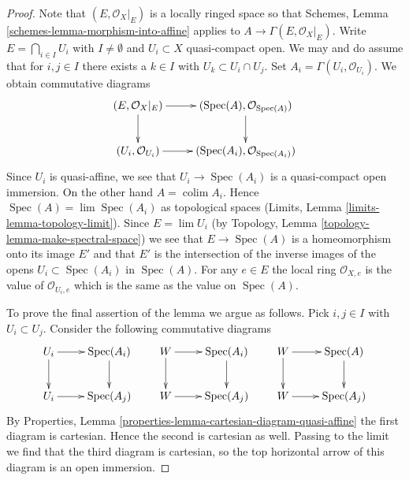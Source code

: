 \documentclass{stacks-project}
\theoremstyle{plain}
\theoremstyle{definition}
\theoremstyle{remark}
\numberwithin{equation}{subsection}
\def\lim{\mathop{\mathrm{lim}}\nolimits}
\def\colim{\mathop{\mathrm{colim}}\nolimits}
\def\Spec{\mathop{\mathrm{Spec}}}
\begin{document}
\begin{proof}
Note that $(E, \mathcal{O}_X|_E)$ is a locally ringed space so that
Schemes, Lemma \ref{schemes-lemma-morphism-into-affine} applies
to $A \to \Gamma(E, \mathcal{O}_X|_E)$. Write $E = \bigcap_{i \in I} U_i$
with $I \not = \emptyset$ and $U_i \subset X$ quasi-compact open.
We may and do assume that for $i, j \in I$ there exists a $k \in I$ with
$U_k \subset U_i \cap U_j$. Set $A_i = \Gamma(U_i, \mathcal{O}_{U_i})$.
We obtain commutative diagrams
$$
\xymatrix{
(E, \mathcal{O}_X|_E) \ar[r] \ar[d] &
(\Spec(A), \mathcal{O}_{\Spec(A)}) \ar[d] \\
(U_i, \mathcal{O}_{U_i}) \ar[r] &
(\Spec(A_i), \mathcal{O}_{\Spec(A_i)})
}
$$
Since $U_i$ is quasi-affine, we see that $U_i \to \Spec(A_i)$
is a quasi-compact open immersion. On the other hand
$A = \colim A_i$. Hence $\Spec(A) = \lim \Spec(A_i)$ as topological
spaces (Limits, Lemma \ref{limits-lemma-topology-limit}). Since
$E = \lim U_i$ (by Topology, Lemma \ref{topology-lemma-make-spectral-space})
we see that $E \to \Spec(A)$ is a homeomorphism onto its
image $E'$ and that $E'$ is the intersection of the inverse images
of the opens $U_i \subset \Spec(A_i)$ in $\Spec(A)$. For any
$e \in E$ the local ring $\mathcal{O}_{X, e}$ is the value
of $\mathcal{O}_{U_i, e}$ which is the same as the value on $\Spec(A)$.

\medskip\noindent
To prove the final assertion of the lemma we argue as follows.
Pick $i, j \in I$ with $U_i \subset U_j$.
Consider the following commutative diagrams
$$
\xymatrix{
U_i \ar[r] \ar[d] & \Spec(A_i) \ar[d] \\
U_i \ar[r] & \Spec(A_j)
}
\quad\quad
\xymatrix{
W \ar[r] \ar[d] & \Spec(A_i) \ar[d] \\
W \ar[r] & \Spec(A_j)
}
\quad\quad
\xymatrix{
W \ar[r] \ar[d] & \Spec(A) \ar[d] \\
W \ar[r] & \Spec(A_j)
}
$$
By Properties, Lemma
\ref{properties-lemma-cartesian-diagram-quasi-affine}
the first diagram is cartesian. Hence the second is cartesian as well.
Passing to the limit we find that the third diagram
is cartesian, so the top horizontal arrow of this diagram is an open immersion.
\end{proof}
\end{document}
